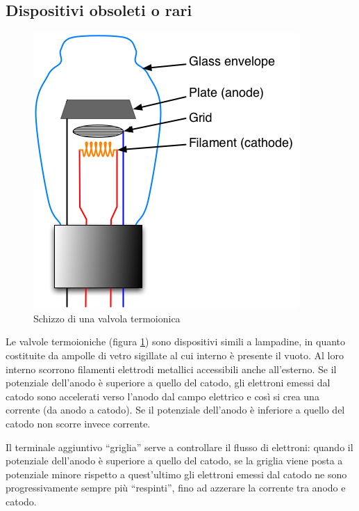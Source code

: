 \documentclass{article}
\begin{document}
\subsection{Dispositivi obsoleti o rari}

\begin{figure}[h]
  \centering
  \includegraphics[scale=0.35]{Triode_vacuum_tube}
  \caption{Schizzo di una valvola termoionica}
  \label{Triode_vacuum_tube}
\end{figure}

Le valvole termoioniche (figura \ref{Triode_vacuum_tube}) sono dispositivi simili a lampadine, in quanto costituite da ampolle di vetro sigillate al cui interno è presente il vuoto. Al loro interno scorrono filamenti elettrodi metallici accessibili anche all'esterno. Se il potenziale dell’anodo è superiore a quello del catodo, gli elettroni emessi dal catodo sono accelerati verso l’anodo dal campo elettrico e così si crea una corrente (da anodo a catodo). Se il potenziale dell’anodo è inferiore a quello del catodo non scorre invece corrente.

\vspace{3mm}

Il terminale aggiuntivo ``griglia'' serve a controllare il flusso di elettroni: quando il potenziale dell’anodo è superiore a quello del catodo, se la griglia viene posta a potenziale minore rispetto a quest'ultimo gli elettroni emessi dal catodo ne sono progressivamente sempre più ``respinti'', fino ad azzerare la corrente tra anodo e catodo. 
\end{document}
